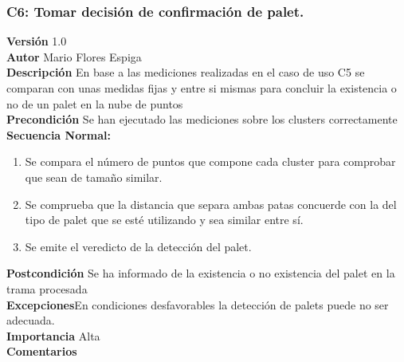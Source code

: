  \subsubsection{ C6: Tomar decisión de confirmación de palet.}
\textbf{Versión} 1.0\\
\textbf{Autor} Mario Flores Espiga\\
\textbf{Descripción} En base a las mediciones realizadas en el caso de uso C5 se comparan con unas medidas fijas y entre si mismas para concluir la existencia o no de un palet en la nube de puntos\\
\textbf{Precondición} Se han ejecutado las mediciones sobre los clusters correctamente\\
\textbf{Secuencia Normal:} 
\begin{enumerate}
	\item Se compara el número de puntos que compone cada cluster para comprobar que sean de tamaño similar.
	\item Se comprueba que la distancia que separa ambas patas concuerde con la del tipo de palet que se esté utilizando y sea similar entre sí.
	\item Se emite el veredicto de la detección del palet.

	

\end{enumerate}
\textbf{Postcondición} Se ha informado de la existencia o no existencia del palet en la trama procesada\\
\textbf{Excepciones}En condiciones desfavorables la detección de palets puede no ser adecuada.\\
\textbf{Importancia} Alta\\
\textbf{Comentarios} 

